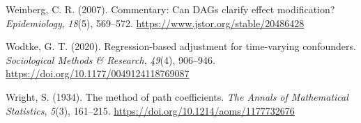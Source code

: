 \documentclass[
  11pt,
  a4paper,
]{article}
\newlength{\cslhangindent}
\newenvironment{CSLReferences}[2] %
 {\begin{list}{}{%
  \setlength{\itemindent}{0pt}
  \setlength{\leftmargin}{0pt}
  \setlength{\parsep}{0pt}
  \ifodd #1
   \setlength{\leftmargin}{\cslhangindent}
   \setlength{\itemindent}{-1\cslhangindent}
  \fi
  \setlength{\itemsep}{#2\baselineskip}}}
 {\end{list}}
\begin{document}
\begin{CSLReferences}{1}{0}
Weinberg, C. R. (2007). Commentary: Can DAGs clarify effect
modification? \emph{Epidemiology}, \emph{18}(5), 569--572.
\url{https://www.jstor.org/stable/20486428}

Wodtke, G. T. (2020). Regression-based adjustment for time-varying
confounders. \emph{Sociological Methods \& Research}, \emph{49}(4),
906--946. \url{https://doi.org/10.1177/0049124118769087}

Wright, S. (1934). The method of path coefficients. \emph{The Annals of
Mathematical Statistics}, \emph{5}(3), 161--215.
\url{https://doi.org/10.1214/aoms/1177732676}

\end{CSLReferences}
\end{document}

